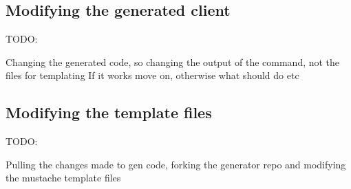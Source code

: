 \subsection{Modifying the generated client}
TODO:

Changing the generated code, so changing the output of the command, not the files for templating
If it works move on, otherwise what should do etc
\subsection{Modifying the template files}
TODO:

Pulling the changes made to gen code, forking the generator repo and modifying the mustache template files